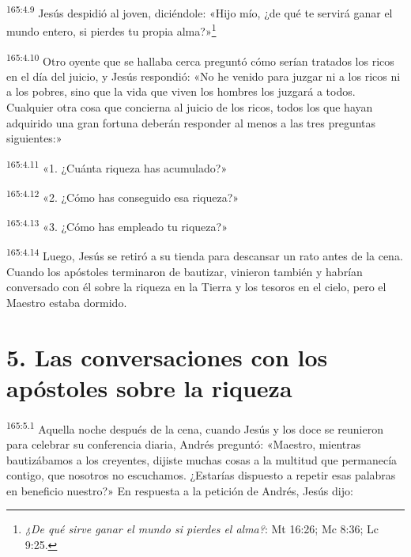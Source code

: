 \par 
\textsuperscript{165:4.9} Jesús despidió al joven, diciéndole: «Hijo mío, ¿de qué te servirá ganar el mundo entero, si pierdes tu propia alma?»\footnote{\textit{¿De qué sirve ganar el mundo si pierdes el alma?}: Mt 16:26; Mc 8:36; Lc 9:25.}

\par 
\textsuperscript{165:4.10} Otro oyente que se hallaba cerca preguntó cómo serían tratados los ricos en el día del juicio, y Jesús respondió: «No he venido para juzgar ni a los ricos ni a los pobres, sino que la vida que viven los hombres los juzgará a todos. Cualquier otra cosa que concierna al juicio de los ricos, todos los que hayan adquirido una gran fortuna deberán responder al menos a las tres preguntas siguientes:»

\par 
\textsuperscript{165:4.11} «1. ¿Cuánta riqueza has acumulado?»

\par 
\textsuperscript{165:4.12} «2. ¿Cómo has conseguido esa riqueza?»

\par 
\textsuperscript{165:4.13} «3. ¿Cómo has empleado tu riqueza?»

\par 
\textsuperscript{165:4.14} Luego, Jesús se retiró a su tienda para descansar un rato antes de la cena. Cuando los apóstoles terminaron de bautizar, vinieron también y habrían conversado con él sobre la riqueza en la Tierra y los tesoros en el cielo, pero el Maestro estaba dormido.

\section*{5. Las conversaciones con los apóstoles sobre la riqueza}
\par 
\textsuperscript{165:5.1} Aquella noche después de la cena, cuando Jesús y los doce se reunieron para celebrar su conferencia diaria, Andrés preguntó: «Maestro, mientras bautizábamos a los creyentes, dijiste muchas cosas a la multitud que permanecía contigo, que nosotros no escuchamos. ¿Estarías dispuesto a repetir esas palabras en beneficio nuestro?» En respuesta a la petición de Andrés, Jesús dijo:

